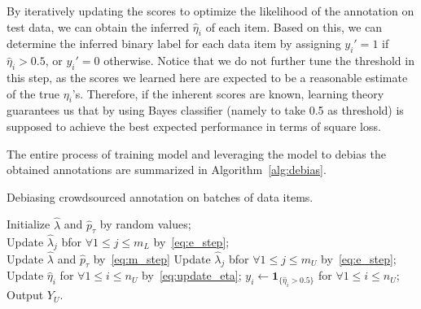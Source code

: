 By iteratively updating the scores to optimize the likelihood of the annotation on test data,
we can obtain the inferred $\hat{\eta}_i$ of each item.
Based on this, we can determine the inferred binary label for each data item by assigning $y_i'=1$ if $\hat{\eta}_i > 0.5$,
or $y_i'=0$ otherwise.
Notice that we do not further tune the threshold in this step,
as the scores we learned here are expected to be a reasonable estimate of the true $\eta_i$'s.
Therefore, if the inherent scores are known,
learning theory guarantees us that by using Bayes classifier (namely to take 0.5 as threshold)
is supposed to achieve the best expected performance in terms of square loss. %


The entire process of training model and leveraging the model to debias the obtained annotations 
are summarized in Algorithm~\ref{alg:debias}.  

\incmargin{1em}
\begin{algorithm}[!t]
       \caption{Debiasing crowdsourced annotation on batches of data items.}\label{alg:debias}
\small

       \BlankLine
       Initialize $\hat{\lambda}$ and $\hat{p}_{\tau}$ by random values; \\
       {
           Update $\hat{\lambda}_j$ bfor $\forall 1 \leq j \leq m_L$ by~\eqref{eq:e_step}; \\
           Update $\hat{\lambda}$ and $\hat{p}_{\tau}$ by~\eqref{eq:m_step}
       }
       \BlankLine
       {
       	   Update $\hat{\lambda}_j$ bfor $\forall 1 \leq j \leq m_U$ by~\eqref{eq:e_step}; \\
           Update $\hat{\eta}_i$ for $\forall 1 \leq i \leq n_U$ by~\eqref{eq:update_eta};
       }
       $y_i \leftarrow \mathbf{1}_{\{\hat{\eta}_i > 0.5\}}$ for $\forall 1 \leq i \leq n_U$; \\
       Output $Y_U$.
\end{algorithm}
\normalsize
\decmargin{1em}


